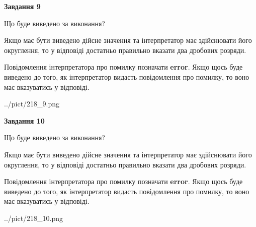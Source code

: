 \documentclass[12pt, ukrainian]{article}
\begin{document}
{\begin {Large}
{\begin {center}\textbf{Завдання 9}\end {center}}\par
Що буде виведено за виконання? \par

Якщо має бути виведено дійсне значення та інтерпретатор має здійснювати його округлення, 
то у відповіді достатньо правильно вказати два дробових розряди.

Повідомлення інтерпретатора про помилку позначати \textbf{error}.
Якщо щось буде виведено до того, як інтерпретатор видасть повідомлення про помилку, 
то воно має вказуватись у відповіді. \par

\begin{center}
	{../pict/218_9.png}
\end{center}
\newpage

{\begin {center}\textbf{Завдання 10}\end {center}}\par
Що буде виведено за виконання? \par

Якщо має бути виведено дійсне значення та інтерпретатор має здійснювати його округлення, 
то у відповіді достатньо правильно вказати два дробових розряди.

Повідомлення інтерпретатора про помилку позначати \textbf{error}.
Якщо щось буде виведено до того, як інтерпретатор видасть повідомлення про помилку, 
то воно має вказуватись у відповіді. \par

\begin{center}
	{../pict/218_10.png}
\end{center}
\newpage

\end {Large}}
\end{document}
